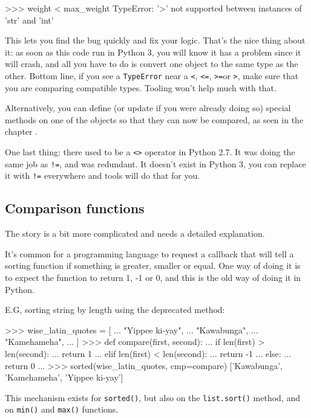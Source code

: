 \begin{py3}
>>> weight < max_weight
TypeError: '>' not supported between instances of 'str' and 'int'
\end{py3}

This lets you find the bug quickly and fix your logic. That's the nice thing about it: as soon as this code run in Python 3, you will know it has a problem since it will crash, and all you have to do is convert one object to the same type as the other. Bottom line, if you see a \lstinline{TypeError} near a \lstinline{<}, \lstinline{<=}, \lstinline{>=}or \lstinline{>}, make sure that you are comparing compatible types. Tooling won't help much with that.

Alternatively, you can define (or update if you were already doing so) special methods on one of the objects so that they can now be compared, as seen in the chapter .

One last thing: there used to be a \lstinline{<>} operator in Python 2.7. It was doing the same job as \lstinline{!=}, and was redundant. It doesn't exist in Python 3, you can replace it with \lstinline{!=} everywhere and tools will do that for you.

\subsection{Comparison functions}

The story is a bit more complicated and needs a detailed explanation.

It's common for a programming language to request a callback that will tell a sorting function if something is greater, smaller or equal. One way of doing it is to expect the function to return 1, -1 or 0, and this is the old way of doing it in Python.

E.G, sorting string by length using the deprecated method:

\begin{py2}
>>> wise_latin_quotes = [
...     "Yippee ki-yay",
...     "Kawabunga",
...     "Kamehameha",
... ]
>>> def compare(first, second):
...     if len(first) > len(second):
...         return 1
...     elif len(first) < len(second):
...         return -1
...     else:
...         return 0
...
>>> sorted(wise_latin_quotes, cmp=compare)
['Kawabunga', 'Kamehameha', 'Yippee ki-yay']
\end{py2}

This mechanism exists for \lstinline{sorted()}, but also on the \lstinline{list.sort()} method, and on \lstinline{min()} and \lstinline{max()} functions.

